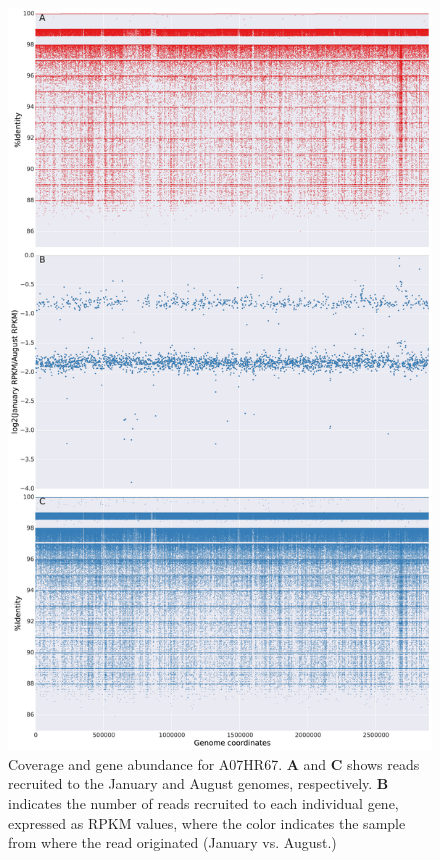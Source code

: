 \begin{figure}[!hbtp]
  \centering
  \includegraphics[width=\textwidth,height=0.8\textheight,keepaspectratio]{Chapter5/Figures/coverage_plots/A07HR67_coverage.pdf}
  \caption{Coverage and gene abundance for A07HR67. \textbf{A} and \textbf{C} shows reads recruited to the January and August genomes, respectively. \textbf{B} indicates the number of reads recruited to each individual gene, expressed as RPKM values, where the color indicates the sample from where the read originated (January vs. August.)}
  \label{A07HR67coverage}
\end{figure}

